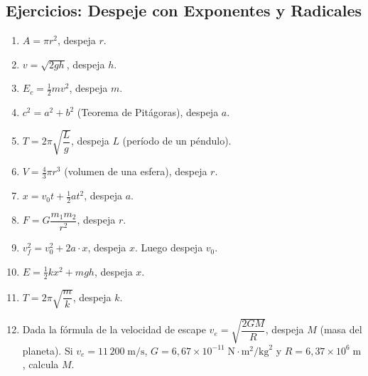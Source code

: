 \documentclass[12pt, a4paper]{article}
\begin{document}
\newpage

\subsection{Ejercicios: Despeje con Exponentes y Radicales}

\begin{enumerate}[leftmargin=*, resume]
  \item \facil{} $A = \pi r^2$, despeja $r$.

  \item \facil{} $v = \sqrt{2gh}$, despeja $h$.

  \item \facil{} $E_c = \frac{1}{2}mv^2$, despeja $m$.

  \item \facil{} $c^2 = a^2 + b^2$ (Teorema de Pitágoras), despeja $a$.

  \item \medio{} $T = 2\pi\sqrt{\dfrac{L}{g}}$, despeja $L$ (período de un péndulo).

  \item \medio{} $V = \frac{4}{3}\pi r^3$ (volumen de una esfera), despeja $r$.

  \item \medio{} $x = v_0 t + \frac{1}{2}at^2$, despeja $a$.

  \item \medio{} $F = G\dfrac{m_1 m_2}{r^2}$, despeja $r$.

  \item \dificil{} $v_f^2 = v_0^2 + 2a \cdot x$, despeja $x$. Luego despeja $v_0$.

  \item \dificil{} $E = \frac{1}{2}kx^2 + mgh$, despeja $x$.

  \item \dificil{} $T = 2\pi\sqrt{\dfrac{m}{k}}$, despeja $k$.

  \item \dificil{} Dada la fórmula de la velocidad de escape $v_e = \sqrt{\dfrac{2GM}{R}}$, despeja $M$ (masa del planeta). Si $v_e = 11\,200\;\text{m/s}$, $G = 6{,}67 \times 10^{-11}\;\text{N}\cdot\text{m}^2/\text{kg}^2$ y $R = 6{,}37 \times 10^6\;\text{m}$, calcula $M$.
\end{enumerate}

\newpage

\end{document}
